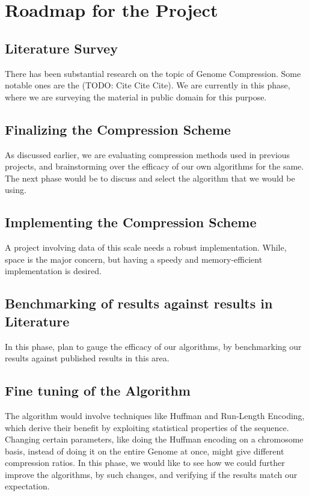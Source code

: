 \documentclass{article}
\begin{document}
\section{Roadmap for the Project}

\subsection{Literature Survey}
There has been substantial research on the topic of Genome Compression. Some notable ones are the \cite{jorde04,dnazip} (TODO: Cite Cite Cite). We are currently in this phase, where we are surveying the material in public domain for this purpose. 

\subsection{Finalizing the Compression Scheme}
As discussed earlier, we are evaluating compression methods used in previous projects, and brainstorming over the efficacy of our own algorithms for the same. The next phase would be to discuss and select the algorithm that we would be using.

\subsection{Implementing the Compression Scheme}
A project involving data of this scale needs a robust implementation. While, space is the major concern, but having a speedy and memory-efficient implementation is desired. 

\subsection{Benchmarking of results against results in Literature}
In this phase, plan to gauge the efficacy of our algorithms, by benchmarking our results against published results in this area.

\subsection{Fine tuning of the Algorithm}
The algorithm would involve techniques like Huffman and Run-Length Encoding, which derive their benefit by exploiting statistical properties of the sequence. Changing certain parameters, like doing the Huffman encoding on a chromosome basis, instead of doing it on the entire Genome at once, might give different compression ratios. In this phase, we would like to see how we could further improve the algorithms, by such changes, and verifying if the results match our expectation.
\end{document}
